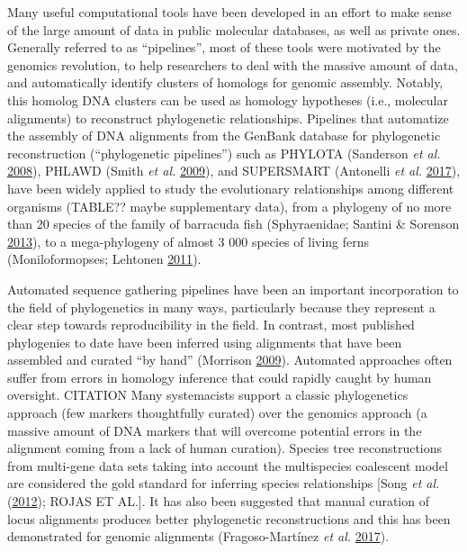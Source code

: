 \documentclass[]{article}
\begin{document}
Many useful computational tools have been developed in an effort to make sense of the large amount of data in public molecular databases, as well as private ones. Generally referred to as ``pipelines'', most of these tools were motivated by the genomics revolution, to help researchers to deal with the massive amount of data, and automatically identify clusters of homologs for genomic assembly. Notably, this homolog DNA clusters can be used as homology hypotheses (i.e., molecular alignments) to reconstruct phylogenetic relationships.
Pipelines that automatize the assembly of DNA alignments from the GenBank database for phylogenetic reconstruction (``phylogenetic pipelines'') such as PHYLOTA (Sanderson \emph{et al.} \protect\hyperlink{ref-sanderson2008phylota}{2008}), PHLAWD (Smith \emph{et al.} \protect\hyperlink{ref-smith2009mega}{2009}), and SUPERSMART (Antonelli \emph{et al.} \protect\hyperlink{ref-antonelli2017toward}{2017}), have been widely applied to study the evolutionary relationships among different organisms (TABLE?? maybe supplementary data), from a phylogeny of no more than 20 species of the family of barracuda fish (Sphyraenidae; Santini \& Sorenson \protect\hyperlink{ref-santini2013first}{2013}), to a mega-phylogeny of almost 3 000 species of living ferns (Moniloformopses; Lehtonen \protect\hyperlink{ref-lehtonen2011towards}{2011}).

Automated sequence gathering pipelines have been an important incorporation to the field of phylogenetics in many ways, particularly because they represent a clear step towards reproducibility in the field. In contrast, most published phylogenies to date have been inferred using alignments that have been assembled and curated ``by hand'' (Morrison \protect\hyperlink{ref-morrison2009would}{2009}).
Automated approaches often suffer from errors in homology inference that could rapidly caught by human oversight. CITATION
Many systemacists support a classic phylogenetics approach (few markers thoughtfully curated) over the genomics approach (a massive amount of DNA markers that will overcome potential errors in the alignment coming from a lack of human curation).
Species tree reconstructions from multi-gene data sets taking into account the multispecies coalescent model are considered the gold standard for inferring species relationships {[}Song \emph{et al.} (\protect\hyperlink{ref-song2012resolving}{2012}); ROJAS ET AL.{]}.
It has also been suggested that manual curation of locus alignments produces better phylogenetic reconstructions and this has been demonstrated for genomic alignments (Fragoso-Martínez \emph{et al.} \protect\hyperlink{ref-fragoso2017pilot}{2017}).
\end{document}
